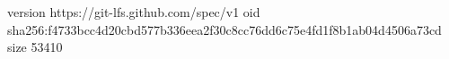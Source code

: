 version https://git-lfs.github.com/spec/v1
oid sha256:f4733bcc4d20cbd577b336eea2f30c8cc76dd6c75e4fd1f8b1ab04d4506a73cd
size 53410
